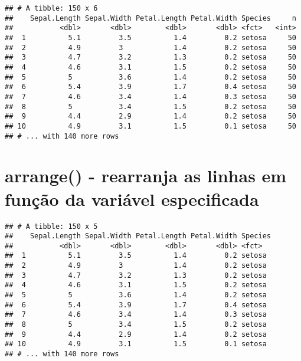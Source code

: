 \documentclass[]{book}
\newenvironment{Shaded}{\begin{snugshade}}{\end{snugshade}}
\newcommand{\KeywordTok}[1]{\textcolor[rgb]{0.13,0.29,0.53}{\textbf{#1}}}
\newcommand{\NormalTok}[1]{#1}
\newcommand{\OperatorTok}[1]{\textcolor[rgb]{0.81,0.36,0.00}{\textbf{#1}}}
\newcommand{\StringTok}[1]{\textcolor[rgb]{0.31,0.60,0.02}{#1}}
\begin{document}
\begin{verbatim}
## # A tibble: 150 x 6
##    Sepal.Length Sepal.Width Petal.Length Petal.Width Species     n
##           <dbl>       <dbl>        <dbl>       <dbl> <fct>   <int>
##  1          5.1         3.5          1.4         0.2 setosa     50
##  2          4.9         3            1.4         0.2 setosa     50
##  3          4.7         3.2          1.3         0.2 setosa     50
##  4          4.6         3.1          1.5         0.2 setosa     50
##  5          5           3.6          1.4         0.2 setosa     50
##  6          5.4         3.9          1.7         0.4 setosa     50
##  7          4.6         3.4          1.4         0.3 setosa     50
##  8          5           3.4          1.5         0.2 setosa     50
##  9          4.4         2.9          1.4         0.2 setosa     50
## 10          4.9         3.1          1.5         0.1 setosa     50
## # ... with 140 more rows
\end{verbatim}

\hypertarget{arrange---rearranja-as-linhas-em-funuxe7uxe3o-da-variuxe1vel-especificada}{%
\section{arrange() - rearranja as linhas em função da variável especificada}\label{arrange---rearranja-as-linhas-em-funuxe7uxe3o-da-variuxe1vel-especificada}}

\begin{Shaded}
\end{Shaded}

\begin{verbatim}
## # A tibble: 150 x 5
##    Sepal.Length Sepal.Width Petal.Length Petal.Width Species
##           <dbl>       <dbl>        <dbl>       <dbl> <fct>  
##  1          5.1         3.5          1.4         0.2 setosa 
##  2          4.9         3            1.4         0.2 setosa 
##  3          4.7         3.2          1.3         0.2 setosa 
##  4          4.6         3.1          1.5         0.2 setosa 
##  5          5           3.6          1.4         0.2 setosa 
##  6          5.4         3.9          1.7         0.4 setosa 
##  7          4.6         3.4          1.4         0.3 setosa 
##  8          5           3.4          1.5         0.2 setosa 
##  9          4.4         2.9          1.4         0.2 setosa 
## 10          4.9         3.1          1.5         0.1 setosa 
## # ... with 140 more rows
\end{verbatim}
\end{document}
